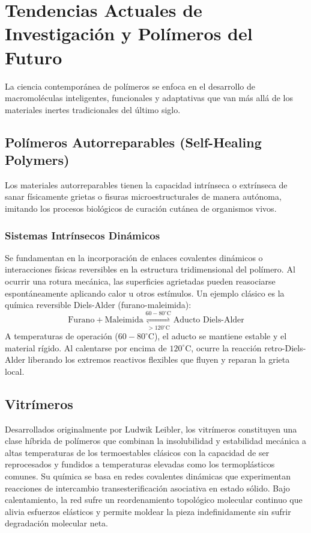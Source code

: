 \chapter{Tendencias Actuales de Investigación y Polímeros del Futuro}
\label{cap:tendencias}

La ciencia contemporánea de polímeros se enfoca en el desarrollo de macromoléculas inteligentes, funcionales y adaptativas que van más allá de los materiales inertes tradicionales del último siglo.

\section{Polímeros Autorreparables (Self-Healing Polymers)}

Los materiales autorreparables tienen la capacidad intrínseca o extrínseca de sanar físicamente grietas o fisuras microestructurales de manera autónoma, imitando los procesos biológicos de curación cutánea de organismos vivos.

\subsection{Sistemas Intrínsecos Dinámicos}
Se fundamentan en la incorporación de enlaces covalentes dinámicos o interacciones físicas reversibles en la estructura tridimensional del polímero. Al ocurrir una rotura mecánica, las superficies agrietadas pueden reasociarse espontáneamente aplicando calor u otros estímulos. Un ejemplo clásico es la química reversible Diels-Alder (furano-maleimida):
\begin{equation}
    \text{Furano} + \text{Maleimida} \underset{> 120^\circ\text{C}}{\overset{60 - 80^\circ\text{C}}{\rightleftharpoons}} \text{Aducto Diels-Alder}
    \label{eq:diels_alder}
\end{equation}
A temperaturas de operación ($60 - 80^\circ\text{C}$), el aducto se mantiene estable y el material rígido. Al calentarse por encima de $120^\circ\text{C}$, ocurre la reacción retro-Diels-Alder liberando los extremos reactivos flexibles que fluyen y reparan la grieta local.

\section{Vitrímeros}

Desarrollados originalmente por Ludwik Leibler, los vitrímeros constituyen una clase híbrida de polímeros que combinan la insolubilidad y estabilidad mecánica a altas temperaturas de los termoestables clásicos con la capacidad de ser reprocesados y fundidos a temperaturas elevadas como los termoplásticos comunes. Su química se basa en redes covalentes dinámicas que experimentan reacciones de intercambio transesterificación asociativa en estado sólido. Bajo calentamiento, la red sufre un reordenamiento topológico molecular continuo que alivia esfuerzos elásticos y permite moldear la pieza indefinidamente sin sufrir degradación molecular neta.
